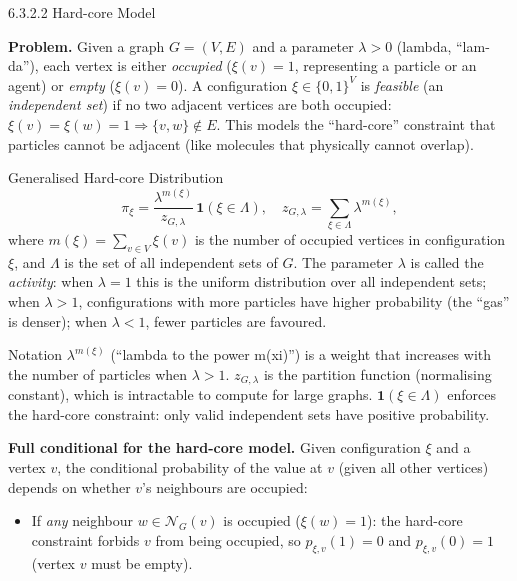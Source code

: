 \documentclass[aspectratio=169,10pt]{beamer}
\begin{document}
\begin{frame}[allowframebreaks]{6.3.2.2 Hard-core Model}

\textbf{Problem.}
Given a graph $G = (V,E)$ and a parameter $\lambda > 0$ (lambda, ``lam-da''), each vertex is either \emph{occupied} ($\xi(v) = 1$, representing a particle or an agent) or \emph{empty} ($\xi(v) = 0$).
A configuration $\xi \in \{0,1\}^V$ is \emph{feasible} (an \emph{independent set}) if no two adjacent vertices are both occupied: $\xi(v) = \xi(w) = 1 \Rightarrow \{v,w\} \notin E$.
This models the ``hard-core'' constraint that particles cannot be adjacent (like molecules that physically cannot overlap).

\begin{block}{Generalised Hard-core Distribution}
\[
  \pi_\xi = \frac{\lambda^{m(\xi)}}{z_{G,\lambda}}\, \mathbf{1}(\xi \in \Lambda),
  \quad z_{G,\lambda} = \sum_{\xi \in \Lambda} \lambda^{m(\xi)},
\]
where $m(\xi) = \sum_{v \in V} \xi(v)$ is the number of occupied vertices in configuration $\xi$, and $\Lambda$ is the set of all independent sets of $G$.
The parameter $\lambda$ is called the \emph{activity}: when $\lambda = 1$ this is the uniform distribution over all independent sets; when $\lambda > 1$, configurations with more particles have higher probability (the ``gas'' is denser); when $\lambda < 1$, fewer particles are favoured.
\end{block}

\begin{block}{Notation}
$\lambda^{m(\xi)}$ (``lambda to the power m(xi)'') is a weight that increases with the number of particles when $\lambda > 1$.
$z_{G,\lambda}$ is the partition function (normalising constant), which is intractable to compute for large graphs.
$\mathbf{1}(\xi \in \Lambda)$ enforces the hard-core constraint: only valid independent sets have positive probability.
\end{block}

\framebreak

\textbf{Full conditional for the hard-core model.}
Given configuration $\xi$ and a vertex $v$, the conditional probability of the value at $v$ (given all other vertices) depends on whether $v$'s neighbours are occupied:

\begin{itemize}
  \item If \emph{any} neighbour $w \in \mathcal{N}_G(v)$ is occupied ($\xi(w) = 1$): the hard-core constraint forbids $v$ from being occupied, so $p_{\xi,v}(1) = 0$ and $p_{\xi,v}(0) = 1$ (vertex $v$ must be empty).


\end{itemize}
\end{frame}
\end{document}
